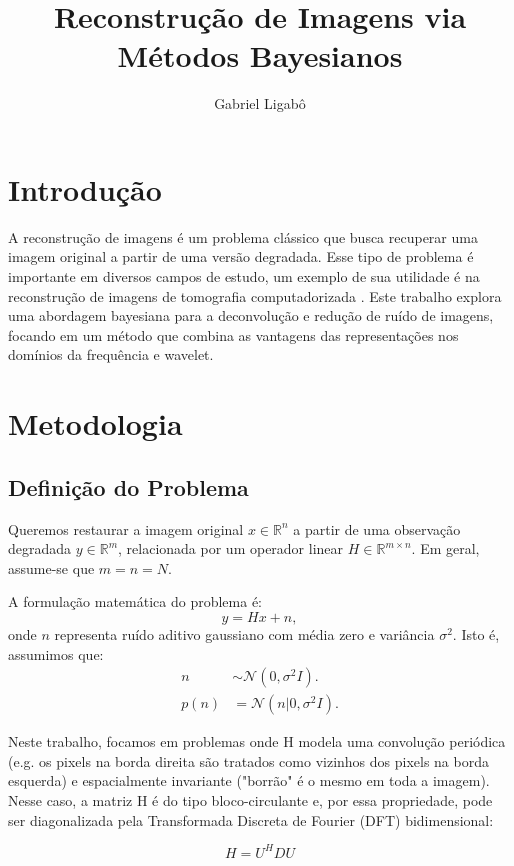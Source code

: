 \documentclass[12pt]{article}
\title{Reconstrução de Imagens via Métodos Bayesianos}
\author{Gabriel Ligabô}
\begin{document}
\maketitle

\section{Introdução}

A reconstrução de imagens é um problema clássico que busca recuperar uma imagem original a partir de uma versão degradada. Esse tipo de problema é importante em diversos campos de estudo, um exemplo de sua utilidade é na reconstrução de imagens de tomografia computadorizada \cite{kas88}. Este trabalho explora uma abordagem bayesiana para a deconvolução e redução de ruído de imagens, focando em um método que combina as vantagens das representações nos domínios da frequência e wavelet.

\section{Metodologia}

\subsection{Definição do Problema}

Queremos restaurar a imagem original $x \in \mathbb{R}^n$ a partir de uma observação degradada $y \in \mathbb{R}^m$, relacionada por um operador linear $H \in \mathbb{R}^{m \times n}$. Em geral, assume-se que $m = n = N$.

A formulação matemática do problema é:
\[
y = Hx + n,
\]
onde $n$ representa ruído aditivo gaussiano com média zero e variância $\sigma^2$. Isto é, assumimos que:
\begin{align*}
n &\sim \mathcal{N}(0, \sigma^2 I). \\
p(n) &= \mathcal{N}(n|0, \sigma^2 I).
\end{align*}

Neste trabalho, focamos em problemas onde H modela uma convolução periódica (e.g. os pixels na borda direita são tratados como vizinhos dos pixels na borda esquerda) e espacialmente invariante ("borrão" é o mesmo em toda a imagem). Nesse caso, a matriz H é do tipo bloco-circulante e, por essa propriedade, pode ser diagonalizada pela Transformada Discreta de Fourier (DFT) bidimensional:

\[
H = U^HDU
\]
\end{document}
